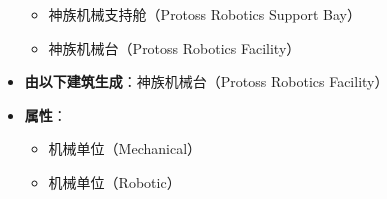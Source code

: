 \begin{tcolorbox}[colback=white, colframe=black!60!white, title=Protoss\_Reaver(), arc=0mm]
\begin{itemize}
            \begin{itemize}
                \item 神族机械支持舱（Protoss Robotics Support Bay）
                \item 神族机械台（Protoss Robotics Facility）
            \end{itemize}
        \item \textbf{由以下建筑生成}：神族机械台（Protoss Robotics Facility）
        \item \textbf{属性}：
            \begin{itemize}
                \item 机械单位（Mechanical）
                \item 机械单位（Robotic）
            \end{itemize}
    \end{itemize}
\end{tcolorbox}

